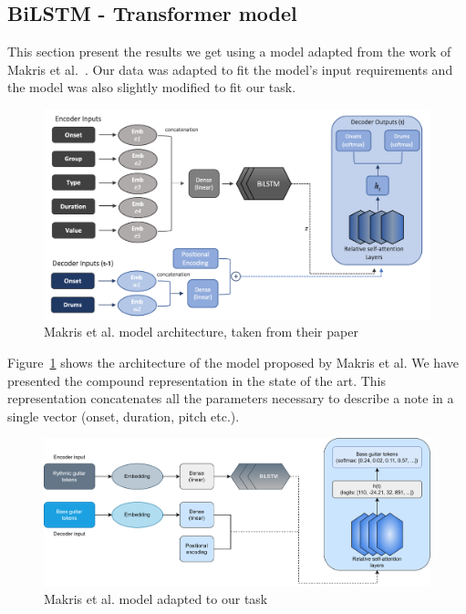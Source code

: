 
\subsection{BiLSTM - Transformer model}

This section present the results we get using a model adapted from the work of Makris et al.~\cite{makris_conditional_2022}.
Our data was adapted to fit the model's input requirements and the model was also slightly modified to fit our task.

\begin{figure}[!ht]
    \centering
    \includegraphics[width=.75\linewidth]{../images-figures/makris_model.png}
    \caption{Makris et al. model architecture, taken from their paper~\cite{makris_conditional_2022}}
    \label{fig:makris_model}
\end{figure}

Figure~\ref{fig:makris_model} shows the architecture of the model proposed by Makris et al.
We have presented the compound representation in the state of the art.
This representation concatenates all the parameters necessary to describe a note in a single vector (onset, duration, pitch etc.).

\begin{figure}[!ht]
    \centering
    \includegraphics[width=.9\linewidth]{../images-figures/model_adapted.png}
    \caption{Makris et al. model adapted to our task}
    \label{fig:makris_model_adapted}
\end{figure}

